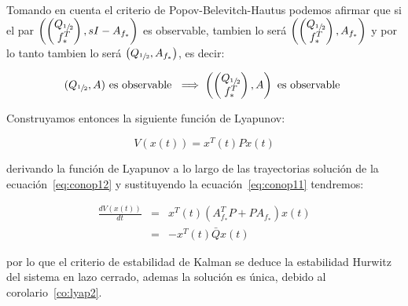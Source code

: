         Tomando en cuenta el criterio de Popov-Belevitch-Hautus podemos afirmar que si el par $\left( \begin{pmatrix} Q_{\sfrac{1}{2}} \\ f_*^T \end{pmatrix} , sI - A_{f_*} \right)$ es observable, tambien lo será $\left( \begin{pmatrix} Q_{\sfrac{1}{2}} \\ f_*^T \end{pmatrix} , A_{f_*} \right)$ y por lo tanto tambien lo será $\left( Q_{\sfrac{1}{2}} , A_{f_*} \right)$, es decir:

        \begin{equation*}
            (Q_{\sfrac{1}{2}}, A) \text{ es observable } \implies \left( \begin{pmatrix}Q_{\sfrac{1}{2}} \\ f_*^T \end{pmatrix}, A \right) \text{ es observable }
        \end{equation*}

        Construyamos entonces la siguiente función de Lyapunov:

        \begin{equation}
            V(x(t)) = x^T(t) P x(t)
        \end{equation}

        derivando la función de Lyapunov a lo largo de las trayectorias solución de la ecuación~\ref{eq:conop12} y sustituyendo la ecuación~\ref{eq:conop11} tendremos:

        \begin{eqnarray*}
            \frac{dV(x(t))}{dt} & = & x^T(t)(A_{f_*}^T P + P A_{f_*})x(t) \\
             & = & -x^T(t) \bar{Q} x(t)
        \end{eqnarray*}

        por lo que el criterio de estabilidad de Kalman se deduce la estabilidad Hurwitz del sistema en lazo cerrado, ademas la solución es única, debido al corolario~\ref{co:lyap2}.
